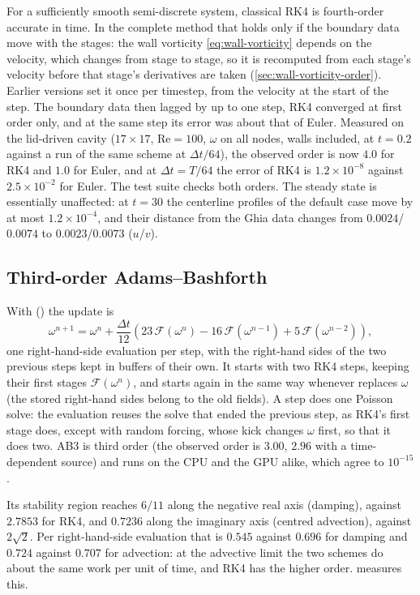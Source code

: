 \documentclass[11pt,a4paper]{article}
\newcommand{\Rey}{\mathrm{Re}}
\newcommand{\dt}{\Delta t}
\newcommand{\code}[1]{\texttt{\detokenize{#1}}}
\begin{document}
For a sufficiently smooth semi-discrete system, classical RK4 is fourth-order accurate in time.  In the complete method that holds only if the boundary data move with the stages: the wall vorticity \cref{eq:wall-vorticity} depends on the velocity, which changes from stage to stage, so it is recomputed from each stage's velocity before that stage's derivatives are taken (\cref{sec:wall-vorticity-order}).  Earlier versions set it once per timestep, from the velocity at the start of the step.  The boundary data then lagged by up to one step, RK4 converged at first order only, and at the same step its error was about that of Euler.  Measured on the lid-driven cavity ($17\times17$, $\Rey=100$, $\omega$ on all nodes, walls included, at $t=0.2$ against a run of the same scheme at $\dt/64$), the observed order is now $4.0$ for RK4 and $1.0$ for Euler, and at $\dt=T/64$ the error of RK4 is $1.2\times10^{-8}$ against $2.5\times10^{-2}$ for Euler.  The test suite checks both orders.  The steady state is essentially unaffected: at $t=30$ the centerline profiles of the default case move by at most $1.2\times10^{-4}$, and their distance from the Ghia data changes from $0.0024$/$0.0074$ to $0.0023$/$0.0073$ ($u$/$v$).

\subsection{Third-order Adams--Bashforth}
\label{sec:ab3}

With \code{time_scheme = 3} (\code{--time-scheme ab3}) the update is
\begin{equation}
\omega^{n+1}=\omega^n+\frac{\dt}{12}\left(23\,\mathcal{F}(\omega^n)-16\,\mathcal{F}(\omega^{n-1})+5\,\mathcal{F}(\omega^{n-2})\right),
\end{equation}
one right-hand-side evaluation per step, with the right-hand sides of the two previous steps kept in buffers of their own.  It starts with two RK4 steps, keeping their first stages $\mathcal{F}(\omega^n)$, and starts again in the same way whenever \code{backend_set_fields()} replaces $\omega$ (the stored right-hand sides belong to the old fields).  A step does one Poisson solve: the evaluation reuses the solve that ended the previous step, as RK4's first stage does, except with random forcing, whose kick changes $\omega$ first, so that it does two.  AB3 is third order (the observed order is $3.00$, $2.96$ with a time-dependent source) and runs on the CPU and the GPU alike, which agree to $10^{-15}$.

Its stability region reaches $6/11$ along the negative real axis (damping), against $2.7853$ for RK4, and $0.7236$ along the imaginary axis (centred advection), against $2\sqrt2$.  Per right-hand-side evaluation that is $0.545$ against $0.696$ for damping and $0.724$ against $0.707$ for advection: at the advective limit the two schemes do about the same work per unit of time, and RK4 has the higher order.   measures this.
\end{document}
